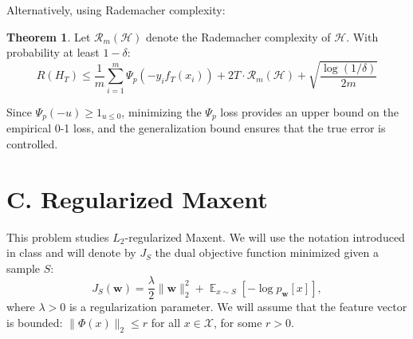 \documentclass[letterpaper, 11pt]{article}
\newcommand{\1}{\mathds{1}}	%
\theoremstyle{definition}
\newtheorem{theorem}{Theorem}[section]
\begin{document}
Alternatively, using Rademacher complexity:
\begin{theorem}
Let $\mathcal{R}_m(\mathcal{H})$ denote the Rademacher complexity of $\mathcal{H}$. With probability at least $1-\delta$:
$$R(H_T) \leq \frac{1}{m}\sum_{i=1}^{m} \Psi_p(-y_i f_T(x_i)) + 2T \cdot \mathcal{R}_m(\mathcal{H}) + \sqrt{\frac{\log(1/\delta)}{2m}}$$
\end{theorem}

Since $\Psi_p(-u) \geq 1_{u \leq 0}$, minimizing the $\Psi_p$ loss provides an upper bound on the empirical 0-1 loss, and the generalization bound ensures that the true error is controlled.

\section*{C. Regularized Maxent}

This problem studies $L_2$-regularized Maxent. We will use the notation introduced in class and will denote by $J_S$ the dual objective function minimized given a sample $S$:
\[
J_S(\mathbf{w}) = \frac{\lambda}{2} \|\mathbf{w}\|_2^2 + \mathop{\mathbb{E}}_{x \sim S} \left[ -\log p_{\mathbf{w}}[x] \right],
\]
where $\lambda > 0$ is a regularization parameter. We will assume that the feature vector is bounded: $\|\Phi(x)\|_2 \leq r$ for all $x \in \mathcal{X}$, for some $r > 0$.
\end{document}

